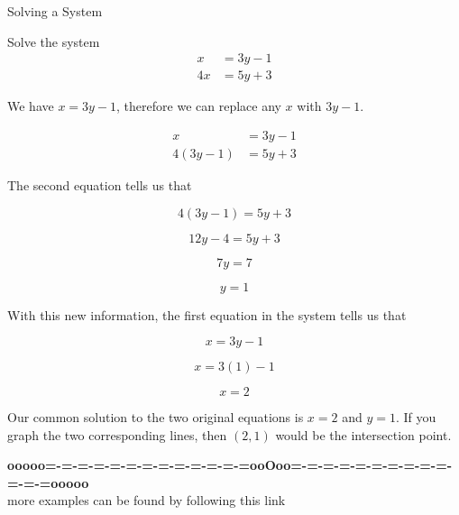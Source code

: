 \documentclass{ximera}
\begin{document}
\begin{example} Solving a System


Solve the system
\begin{align*}
x & = 3y - 1 \\
4x & = 5y + 3
\end{align*}

\begin{explanation}

We have $x = 3y - 1$, therefore we can replace any $x$ with $3y - 1$.  

\begin{align*}
x & = 3y - 1 \\
4(3y - 1) & = 5y + 3
\end{align*}


The second equation tells us that 


\[   4(3y - 1) = 5y + 3   \]

\[   12y- 4 = 5y + 3   \]


\[ 7y = 7 \]


\[ y = 1 \]

With this new information, the first equation in the system tells us that

\[ x = 3y - 1 \]

\[ x = 3(1) - 1 \]

\[ x = 2 \]

Our common solution to the two original equations is $x = 2$ and $y = 1$.  If you graph the two corresponding lines, then $(2, 1)$ would be the intersection point.

\end{explanation}
\end{example}









\begin{center}
\textbf{\textcolor{green!50!black}{ooooo=-=-=-=-=-=-=-=-=-=-=-=-=ooOoo=-=-=-=-=-=-=-=-=-=-=-=-=ooooo}} \\

more examples can be found by following this link\\ 

\end{center}
\end{document}
